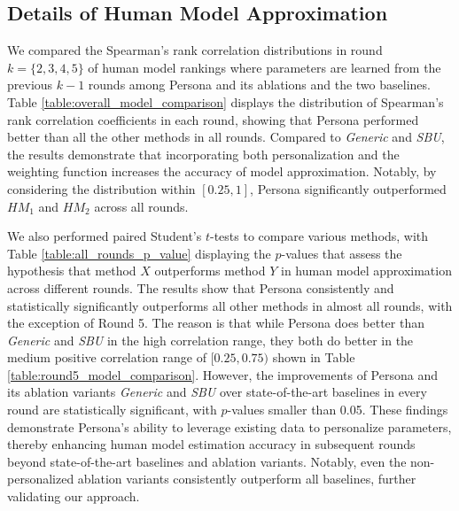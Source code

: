 \subsection{Details of Human Model Approximation}


We compared the Spearman’s rank correlation distributions in round $k = \{2,3,4,5\}$ of human model rankings where parameters are learned from the previous $k-1$ rounds among Persona and its ablations and the two baselines. Table \ref{table:overall_model_comparison} displays the distribution of Spearman's rank correlation coefficients in each round, showing that Persona performed better than all the other methods in all rounds. Compared to \textit{Generic} and \textit{SBU}, the results demonstrate that incorporating both personalization and the weighting function increases the accuracy of model approximation. Notably, by considering the distribution within $[0.25, 1]$, Persona significantly outperformed $H\!M_1$ and $H\!M_2$ across all rounds.


We also performed paired Student's $t$-tests to compare various methods, with Table \ref{table:all_rounds_p_value} displaying the $p$-values that assess the hypothesis that method $X$ outperforms method $Y$ in human model approximation across different rounds. The results show that Persona consistently and statistically significantly outperforms all other methods in almost all rounds, with the exception of Round 5. The reason is that while Persona does better than \textit{Generic} and \textit{SBU} in the high correlation range, they both do better in the medium positive correlation range of $[0.25, 0.75)$ shown in Table \ref{table:round5_model_comparison}. However, the improvements of Persona and its ablation variants \textit{Generic} and \textit{SBU} over state-of-the-art baselines in every round are statistically significant, with $p$-values smaller than 0.05. 
These findings demonstrate Persona's ability to leverage existing data to personalize parameters, thereby enhancing human model estimation accuracy in subsequent rounds beyond state-of-the-art baselines and ablation variants. Notably, even the non-personalized ablation variants consistently outperform all baselines, further validating our approach.





